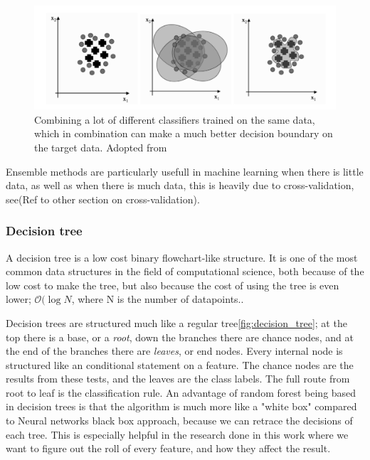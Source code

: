 \begin{figure}[H]
     \centering
     \includegraphics[width=\linewidth]{theory/figures/ensemble_learning.png}
     \caption{Combining a lot of different classifiers trained on the same data, which in combination can make a much better decision boundary on the target data. Adopted from \cite{marsland2014machine}}
     \label{fig:ensemble_learning}
\end{figure}	

Ensemble methods are particularly usefull in machine learning when there is little data, as well as when there is much data, this is heavily due to cross-validation, see(Ref to other section on cross-validation). 

\subsubsection{Decision tree}

A decision tree is a low cost binary flowchart-like structure. It is one of the most common data structures in the field of computational science, both because of the low cost to make the tree, but also because the cost of using the tree is even lower; $\mathcal{O}(\log{N}$, where N is the number of datapoints.\cite{marsland2014machine}. 

Decision trees are structured much like a regular tree\ref{fig:decision_tree}; at the top there is a base, or a \textit{root}, down the branches there are chance nodes, and at the end of the branches there are \textit{leaves}, or end nodes. Every internal node is structured like an conditional statement on a feature. The chance nodes are the results from these tests, and the leaves are the class labels. The full route from root to leaf is the classification rule. An advantage of random forest being based in decision trees is that the algorithm is much more like a "white box" compared to Neural networks black box approach, because we can retrace the decisions of each tree. This is especially helpful in the research done in this work where we want to figure out the roll of every feature, and how they affect the result.

